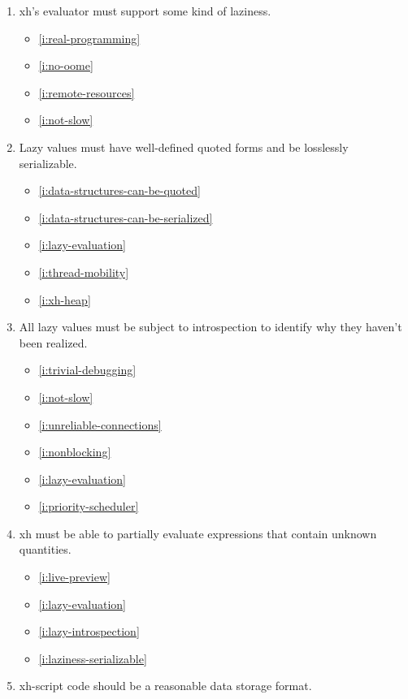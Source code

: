 \documentclass{report}
\makeatletter
\newcommand*{\Label}[2]{%
  \@bsphack
  \begingroup
    \label{#1-original}%
    \def\@currentlabel{#2 [\ref{#1-original}]}%
    \label{#1}%
  \endgroup
  \@esphack
}
\makeatother
\begin{document}
\begin{enumerate}
\item{}\Label{i:lazy-evaluation}{lazy}
  xh's evaluator must support some kind of laziness.
\begin{itemize}
\item \ref{i:real-programming}
\item \ref{i:no-oome}
\item \ref{i:remote-resources}
\item \ref{i:not-slow}
\end{itemize}
\item{}\Label{i:laziness-serializable}{printlazy}
  Lazy values must have well-defined quoted forms and be losslessly
  serializable.
\begin{itemize}
\item \ref{i:data-structures-can-be-quoted}
\item \ref{i:data-structures-can-be-serialized}
\item \ref{i:lazy-evaluation}
\item \ref{i:thread-mobility}
\item \ref{i:xh-heap}
\end{itemize}
\item{}\Label{i:lazy-introspection}{introspectlazy}
  All lazy values must be subject to introspection to identify why they
  haven't been realized.
\begin{itemize}
\item \ref{i:trivial-debugging}
\item \ref{i:not-slow}
\item \ref{i:unreliable-connections}
\item \ref{i:nonblocking}
\item \ref{i:lazy-evaluation}
\item \ref{i:priority-scheduler}
\end{itemize}
\item{}\Label{i:abstract-evaluation}{abstract}
  xh must be able to partially evaluate expressions that contain unknown
  quantities.
\begin{itemize}
\item \ref{i:live-preview}
\item \ref{i:lazy-evaluation}
\item \ref{i:lazy-introspection}
\item \ref{i:laziness-serializable}
\end{itemize}
\item{}\Label{i:code-as-data}{code=data}
  xh-script code should be a reasonable data storage format.
\begin{itemize}

\end{itemize}
\end{enumerate}
\end{document}
